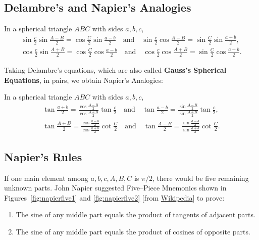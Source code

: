 \documentclass[12pt,a4paper]{memoir}
\theoremstyle{definition}
\begin{document}
\subsection{Delambre's and Napier's Analogies}

	\begin{question}[name={Delambre's Aanlogies}]
		In a spherical triangle $ABC$ with sides $a,b,c$,
		\begin{align*}
			\sin\frac{c}{2}\sin\frac{A-B}{2} = \cos\frac{C}{2}\sin\frac{a-b}{2} \quad \text{and} \quad
			\sin\frac{c}{2}\cos\frac{A-B}{2} = \sin\frac{C}{2}\sin\frac{a+b}{2},\\
			\cos\frac{c}{2}\sin\frac{A+B}{2} = \cos\frac{C}{2}\cos\frac{a-b}{2} \quad \text{and} \quad
			\cos\frac{c}{2}\cos\frac{A+B}{2} = \sin\frac{C}{2}\cos\frac{a+b}{2}.
		\end{align*}
	\end{question}


\noindent Taking Delambre's equations, which are also called \textbf{Gauss's Spherical Equations}, in pairs, we obtain Napier's Analogies:

	\begin{question}[name={Napier's Aanlogies}]
		In a spherical triangle $ABC$ with sides $a,b,c$,
		\begin{align*}
			\tan\frac{a+b}{2} = \frac{\displaystyle\cos\frac{A-B}{2}}{\displaystyle\cos\frac{A+B}{2}}\tan\frac{c}{2} \quad \text{and} \quad
			\tan\frac{a-b}{2} = \frac{\displaystyle\sin\frac{A-B}{2}}{\displaystyle\sin\frac{A+B}{2}}\tan\frac{c}{2},\\
			\tan\frac{A+B}{2} = \frac{\displaystyle\cos\frac{a-b}{2}}{\displaystyle\cos\frac{a+b}{2}}\cot\frac{C}{2} \quad \text{and} \quad
			\tan\frac{A-B}{2} = \frac{\displaystyle\sin\frac{a-b}{2}}{\displaystyle\sin\frac{a+b}{2}}\cot\frac{C}{2}.
		\end{align*}
	\end{question}




\subsection{Napier's Rules}

	\begin{question}[name={Napier's Rules for Right Spherical Triangles}]
		If one main element among $a,b,c,A,B,C$ is $\pi/2$, there would be five remaining unknown parts. John Napier suggested Five--Piece Mnemonics shown in Figures~\ref{fig:napierfive1} and \ref{fig:napierfive2} [from \href{https://en.wikipedia.org/wiki/File:Spherical_trigonometry_Napier_right-angled.svg}{Wikipedia}] to prove:
		\begin{enumerate}
			\item The sine of any middle part equals the product of tangents of adjacent parts.
			\item The sine of any middle part equals the product of cosines of opposite parts.
		\end{enumerate}
	\end{question}
\end{document}
